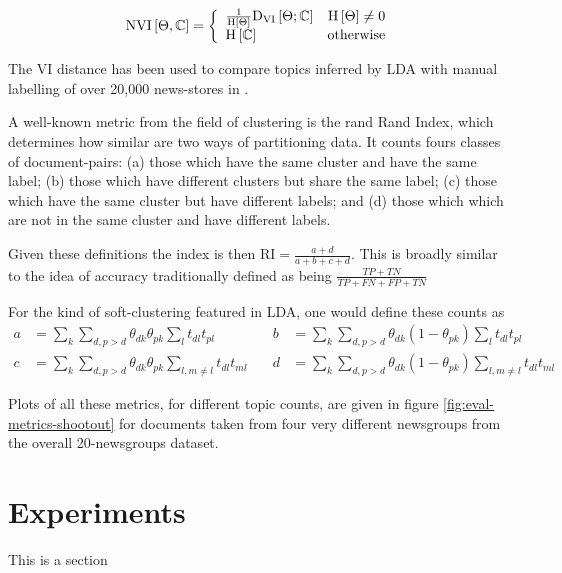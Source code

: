 \begin{align}
\text{NVI}\left[ \Theta, \mathbb{C} \right] = \left\{ \begin{array}{lr}
     \frac{1}{\text{H} \left[ \Theta \right]}\text{D}_\text{VI} \left[ \Theta; \mathbb{C} \right] & \text{H} \left[ \Theta \right] \neq 0 \\
     \text{H} \left[ \mathbb{C} \right] & \text{otherwise}
 \end{array}\right.
\end{align}


The VI distance has been used to compare topics inferred by LDA with manual labelling of over 20,000 news-stores in \cite{HeinrichEtAl2005}. 


A well-known metric from the field of clustering is the rand Rand Index, which determines how similar are two ways of partitioning data. It counts fours classes of document-pairs: (a) those which have the same cluster and have the same label; (b) those which have different clusters but share the same label; (c) those which have the same cluster but have different labels; and (d) those which which are not in the same cluster and have different labels.

Given these definitions the index is then $\text{RI} = \frac{a + d}{a + b + c + d}$. This is broadly similar to the idea of accuracy traditionally defined as being $\frac{TP + TN}{TP + FN + FP + TN}$

For the kind of soft-clustering featured in LDA, one would define these counts as
\begin{equation}
\begin{aligned}
a & = \sum_k \sum_{d, {p>d}} \theta_{dk} \theta_{pk} \sum_l t_{dl}t_{pl} & \quad
b & = \sum_k \sum_{d, {p>d}} \theta_{dk} (1 -\theta_{pk}) \sum_l t_{dl}t_{pl}\\
c & = \sum_k \sum_{d, {p>d}} \theta_{dk} \theta_{pk} \sum_{l,m \neq l} t_{dl}t_{ml} & \quad
d & = \sum_k \sum_{d, {p>d}} \theta_{dk} (1- \theta_{pk}) \sum_{l,m \neq l} t_{dl}t_{ml}
\end{aligned}
\end{equation}

Plots of all these metrics, for different topic counts, are given in figure \ref{fig:eval-metrics-shootout} for documents taken from four very different newsgroups from the overall 20-newsgroups dataset.

\section{Experiments}
\label{sec:chap1:experiments}
This is a section

